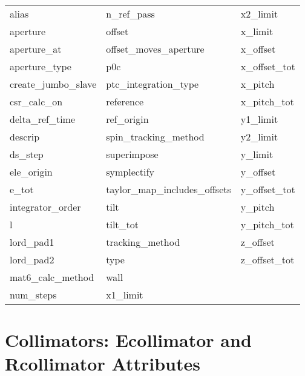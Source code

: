  \begin{tabular}{lll} \toprule
alias                       & n_ref_pass                  & x2_limit                    \\
aperture                    & offset                      & x_limit                     \\
aperture_at                 & offset_moves_aperture       & x_offset                    \\
aperture_type               & p0c                         & x_offset_tot                \\
create_jumbo_slave          & ptc_integration_type        & x_pitch                     \\
csr_calc_on                 & reference                   & x_pitch_tot                 \\
delta_ref_time              & ref_origin                  & y1_limit                    \\
descrip                     & spin_tracking_method        & y2_limit                    \\
ds_step                     & superimpose                 & y_limit                     \\
ele_origin                  & symplectify                 & y_offset                    \\
e_tot                       & taylor_map_includes_offsets & y_offset_tot                \\
integrator_order            & tilt                        & y_pitch                     \\
l                           & tilt_tot                    & y_pitch_tot                 \\
lord_pad1                   & tracking_method             & z_offset                    \\
lord_pad2                   & type                        & z_offset_tot                \\
mat6_calc_method            & wall                        &                             \\
num_steps                   & x1_limit                    &                             \\
 \bottomrule
 \end{tabular}
 \vfill
 
 \section{Collimators: Ecollimator and Rcollimator Attributes}
 \label{s:list.collimator}
 
